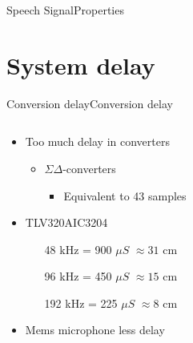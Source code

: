 \begin{frame}{Speech Signal}{Properties}
\section{System delay}
\begin{frame}{Conversion delay}{Conversion delay}
	\begin{columns}
		\begin{column}{0.4\textwidth}
		\begin{itemize}
		\item Too much delay in converters
				\begin{itemize}
				\item $\Sigma \Delta$-converters
				\begin{itemize}
				\item Equivalent to 43 samples
				\end{itemize}								
				\end{itemize}
		\item TLV320AIC3204
				\begin{itemize}
				\item[\textcolor{MATLABred}{48 kHz}]= 900 $\mu S$ $\approx 31$ cm
				\item[\textcolor{MATLAByellow}{96 kHz}]= 450 $\mu S$ $\approx 15$ cm
				\item[\textcolor{MATLABpurple}{192 kHz}]= 225 $\mu S$ $\approx 8$ cm
				\end{itemize}	
				\item Mems 	microphone less delay	 
		\end{itemize}
		\end{column}
		\begin{column}{0.6\textwidth} 
		\begin{center}
		
		\end{center}
		\end{column}
	\end{columns}
\end{frame}


\end{frame}
